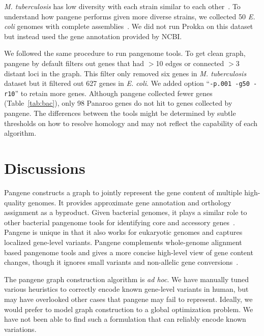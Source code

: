 \documentclass[webpdf,contemporary,large,namedate]{oup-authoring-template}%
\begin{document}
\emph{M. tuberculosis} has low diversity with each strain similar to each other~\citep{Marin:2022aa}.
To understand how pangene performs given more diverse strains,
we collected 50 \emph{E. coli} genomes with complete assemblies~\citep{Shaw:2021aa}.
We did not run Prokka on this dataset but instead used the gene annotation provided by NCBI.

We followed the same procedure to run pangenome tools.
To get clean graph, pangene by default filters out genes that had $>$10 edges or connected $>$3 distant loci in the graph.
This filter only removed six genes in \emph{M. tuberculosis} dataset but
it filtered out 627 genes in \emph{E. coli}.
We added option ``{\tt -p.001 -g50 -r10}'' to retain more genes.
Although pangene collected fewer genes (Table~\ref{tab:bac}),
only 98 Panaroo genes do not hit to genes collected by pangene.
The differences between the tools might be determined by subtle thresholds on how to resolve homology
and may not reflect the capability of each algorithm.

\section{Discussions}

Pangene constructs a graph to jointly represent the gene content of multiple high-quality genomes.
It provides approximate gene annotation and orthology assignment as a byproduct.
Given bacterial genomes, it plays a similar role to other bacterial pangenome tools
for identifying core and accessory genes~\citep{Tonkin-Hill:2023aa}.
Pangene is unique in that it also works for eukaryotic genomes
and captures localized gene-level variants.
Pangene complements whole-genome alignment based pangenome tools
and gives a more concise high-level view of gene content changes,
though it ignores small variants and non-allelic gene conversions~\citep{Vollger:2023aa}.

The pangene graph construction algorithm is \emph{ad hoc}.
We have manually tuned various heuristics to correctly encode known gene-level variants in human,
but may have overlooked other cases that pangene may fail to represent.
Ideally, we would prefer to model graph construction to a global optimization problem.
We have not been able to find such a formulation that can reliably encode known variations.
\end{document}
